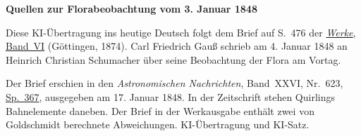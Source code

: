 \clearpage\thispagestyle{empty}
\begin{center}\textbf{Quellen zur Florabeobachtung vom 3. Januar 1848}\end{center}
\noindent Diese KI-Übertragung ins heutige Deutsch folgt dem Brief auf S.~476 der \href{https://gdz.sub.uni-goettingen.de/id/PPN236007467}{\textit{Werke}, Band~VI} (Göttingen, 1874). Carl Friedrich Gauß schrieb am 4. Januar 1848 an Heinrich Christian Schumacher über seine Beobachtung der Flora am Vortag.
\par\smallskip\noindent Der Brief erschien in den \textit{Astronomischen Nachrichten}, Band~XXVI, Nr.~623, \href{https://api.digitale-sammlungen.de/iiif/image/v2/bsb10049451_00194/full/1800,/0/default.jpg}{Sp.~367}, ausgegeben am 17. Januar 1848. In der Zeitschrift stehen Quirlings Bahnelemente daneben. Der Brief in der Werkausgabe enthält zwei von Goldschmidt berechnete Abweichungen. KI-Übertragung und KI-Satz.
\clearpage
